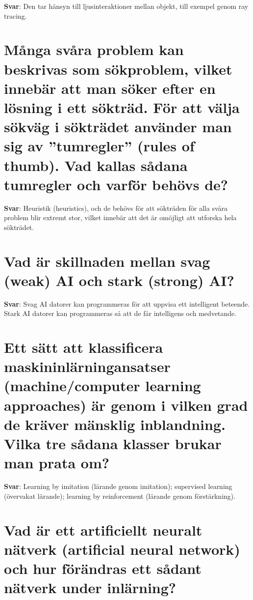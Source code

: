 \documentclass[a4paper,11pt,oneside]{book}
\begin{document}
\begin{sloppypar}
\label{q:310:sa:sv:True}

\textbf{Svar}: Den tar h\"ansyn till ljusinteraktioner mellan objekt, till exempel genom ray tracing.



\section{M\r{a}nga sv\r{a}ra problem kan beskrivas som s\"okproblem, vilket inneb\"ar att man s\"oker efter en l\"osning i ett s\"oktr\"ad. F\"or att v\"alja s\"okv\"ag i s\"oktr\"adet anv\"ander man sig av {\textquotedblright}tumregler{\textquotedblright} (rules of thumb). Vad kallas s\r{a}dana tumregler och varf\"or beh\"ovs de?}

\label{q:311:sa:sv:True}

\textbf{Svar}: Heuristik (heuristics), och de beh\"ovs f\"or att s\"oktr\"aden f\"or alla sv\r{a}ra problem blir extremt stor, vilket inneb\"ar att det \"ar om\"ojligt att utforska hela s\"oktr\"adet.



\section{Vad \"ar skillnaden mellan svag (weak) AI och stark (strong) AI?}

\label{q:312:sa:sv:True}

\textbf{Svar}: Svag AI {\textendash} datorer kan programmeras f\"or att uppvisa ett intelligent beteende. Stark AI {\textendash} datorer kan programmeras s\r{a} att de f\r{a}r intelligens och medvetande.



\section{Ett s\"att att klassificera maskininl\"arningansatser (machine/computer learning approaches) \"ar genom i vilken grad de kr\"aver m\"ansklig inblandning. Vilka tre s\r{a}dana klasser brukar man prata om?}

\label{q:313:sa:sv:True}

\textbf{Svar}: Learning by imitation (l\"arande genom imitation); supervised learning (\"overvakat l\"arande); learning by reinforcement (l\"arande genom f\"orst\"arkning).



\section{Vad \"ar ett artificiellt neuralt n\"atverk (artificial neural network) och hur f\"or\"andras ett s\r{a}dant n\"atverk under inl\"arning?}


\end{sloppypar}
\end{document}
